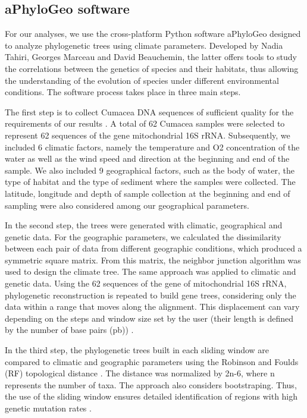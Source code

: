 \subsection{aPhyloGeo software}

For our analyses, we use the cross-platform Python software aPhyloGeo designed to analyze phylogenetic trees using climate parameters. Developed by Nadia Tahiri, Georges Marceau and David Beauchemin, the latter offers tools to study the correlations between the genetics of species and their habitats, thus allowing the understanding of the evolution of species under different environmental conditions. The software process takes place in three main steps. 

    The first step is to collect Cumacea DNA sequences of sufficient quality for the requirements of our results \citep{koshkarov_phylogeography_2022}. A total of 62 Cumacea samples were selected to represent 62 sequences of the gene mitochondrial 16S rRNA. Subsequently, we included 6 climatic factors, namely the temperature and O2 concentration of the water as well as the wind speed and direction at the beginning and end of the sample. We also included 9 geographical factors, such as the body of water, the type of habitat and the type of sediment where the samples were collected. The latitude, longitude and depth of sample collection at the beginning and end of sampling were also considered among our geographical parameters.

    In the second step, the trees were generated with climatic, geographical and genetic data. For the geographic parameters, we calculated the dissimilarity between each pair of data from different geographic conditions, which produced a symmetric square matrix. From this matrix, the neighbor junction algorithm was used to design the climate tree. The same approach was applied to climatic and genetic data. Using the 62 sequences of the gene of mitochondrial 16S rRNA, phylogenetic reconstruction is repeated to build gene trees, considering only the data within a range that moves along the alignment. This displacement can vary depending on the steps and window size set by the user (their length is defined by the number of base pairs (pb)) \citep{koshkarov_phylogeography_2022}.

    In the third step, the phylogenetic trees built in each sliding window are compared to climatic and geographic parameters using the Robinson and Foulds (RF) topological distance \citep{robinson_comparison_1981, koshkarov_phylogeography_2022}. The distance was normalized by 2n-6, where n represents the number of taxa. The approach also considers bootstraping. Thus, the use of the sliding window ensures detailed identification of regions with high genetic mutation rates \citep{koshkarov_phylogeography_2022}.

